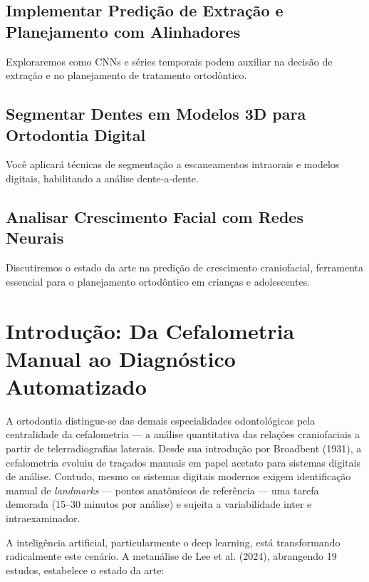 \subsection{Implementar Predição de Extração e Planejamento com Alinhadores}
Exploraremos como CNNs e séries temporais podem auxiliar na decisão de extração e no planejamento de tratamento ortodôntico.

\subsection{Segmentar Dentes em Modelos 3D para Ortodontia Digital}
Você aplicará técnicas de segmentação a escaneamentos intraorais e modelos digitais, habilitando a análise dente-a-dente.

\subsection{Analisar Crescimento Facial com Redes Neurais}
Discutiremos o estado da arte na predição de crescimento craniofacial, ferramenta essencial para o planejamento ortodôntico em crianças e adolescentes.

\section{Introdução: Da Cefalometria Manual ao Diagnóstico Automatizado}

A ortodontia distingue-se das demais especialidades odontológicas pela centralidade da cefalometria --- a análise quantitativa das relações craniofaciais a partir de telerradiografias laterais. Desde sua introdução por Broadbent (1931), a cefalometria evoluiu de traçados manuais em papel acetato para sistemas digitais de análise. Contudo, mesmo os sistemas digitais modernos exigem identificação manual de \textit{landmarks} --- pontos anatômicos de referência --- uma tarefa demorada (15--30 minutos por análise) e sujeita a variabilidade inter e intraexaminador.

A inteligência artificial, particularmente o deep learning, está transformando radicalmente este cenário. A metanálise de Lee et al. (2024), abrangendo 19 estudos, estabelece o estado da arte:


